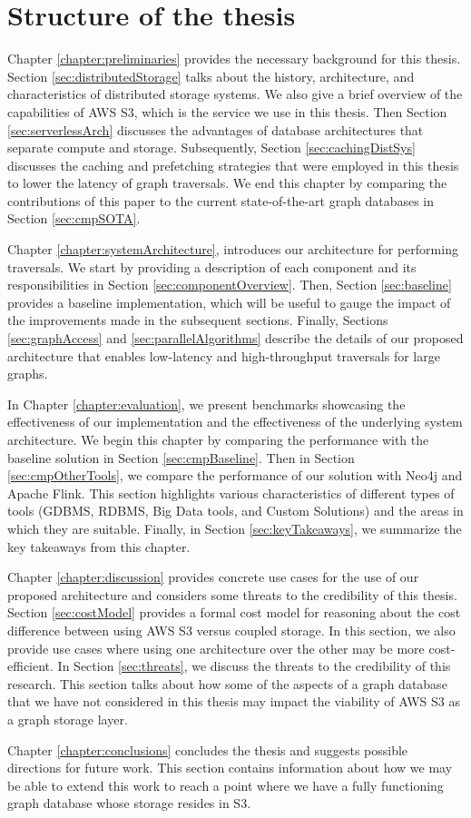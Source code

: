 \section{Structure of the thesis}

\medskip
Chapter \ref{chapter:preliminaries} provides the necessary background for
this thesis. Section \ref{sec:distributedStorage} talks about the
history, architecture, and characteristics of distributed storage systems. We
also give a brief overview of the capabilities of AWS S3, which is the service
we use in this thesis. Then
Section \ref{sec:serverlessArch} discusses the advantages of database
architectures that separate compute and storage. Subsequently, 
Section \ref{sec:cachingDistSys} discusses the caching and prefetching
strategies that were employed in this thesis to lower the latency of graph
traversals. We end this chapter by comparing the contributions of this paper to
the current state-of-the-art graph databases in Section \ref{sec:cmpSOTA}.

\medskip
Chapter \ref{chapter:systemArchitecture}, introduces our architecture for
performing traversals. We start by providing a description of each component and
its responsibilities in Section \ref{sec:componentOverview}. 
Then, Section \ref{sec:baseline} provides a baseline implementation, 
which will be useful to gauge
the impact of the improvements made in the subsequent sections. Finally, 
Sections \ref{sec:graphAccess} and \ref{sec:parallelAlgorithms} 
describe the details of our proposed architecture
that enables low-latency and high-throughput traversals for large graphs.

\medskip
In Chapter \ref{chapter:evaluation}, we present benchmarks showcasing the
effectiveness of our implementation and the effectiveness of the underlying 
system architecture. We begin this chapter by
comparing the performance with the baseline solution in
Section \ref{sec:cmpBaseline}. Then in Section \ref{sec:cmpOtherTools}, we
compare the performance of our solution with Neo4j and Apache Flink. This
section highlights various characteristics of different types of tools (GDBMS,
RDBMS, Big Data tools, and Custom Solutions) and the areas in which they 
are suitable. Finally, in Section \ref{sec:keyTakeaways}, we summarize the key
takeaways from this chapter.

\medskip
Chapter \ref{chapter:discussion} provides concrete use cases for the use of our
proposed architecture and considers some threats to the credibility of this
thesis. Section \ref{sec:costModel} provides a formal cost model for reasoning
about the cost difference between using AWS S3 versus coupled storage. In this
section, we also provide use cases where using one architecture over the other
may be more cost-efficient. In Section \ref{sec:threats}, we discuss the threats
to the credibility of this research. This section talks about how some of the
aspects of a graph database that we have not considered in this thesis may
impact the viability of AWS S3 as a graph storage layer. 

\medskip
Chapter \ref{chapter:conclusions} concludes the thesis and
suggests possible directions for future work. This section contains information
about how we may be able to extend this work to reach a point where we have a
fully functioning graph database whose storage resides in S3.
